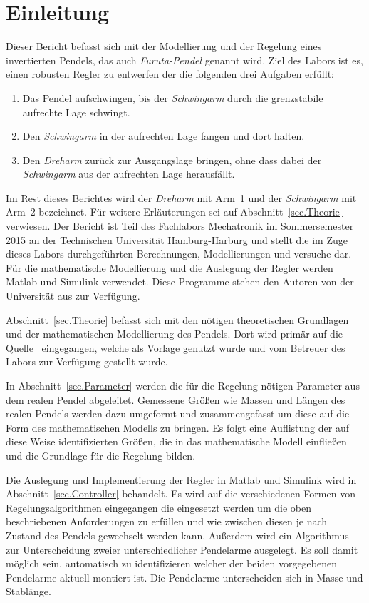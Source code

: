 \section{Einleitung}
\label{sec.Einleitung}

Dieser Bericht befasst sich mit der Modellierung und der Regelung eines invertierten Pendels, das auch \emph{Furuta-Pendel} genannt wird. 
Ziel des Labors ist es, einen robusten Regler zu entwerfen der die folgenden drei Aufgaben erfüllt:
\begin{enumerate}
	\item Das Pendel aufschwingen, bis der \emph{Schwingarm} durch die grenzstabile aufrechte Lage schwingt.
	\item Den \emph{Schwingarm} in der aufrechten Lage fangen und dort halten.
	\item Den \emph{Dreharm} zurück zur Ausgangslage bringen, ohne dass dabei der \emph{Schwingarm} aus der aufrechten Lage herausfällt.
\end{enumerate}
Im Rest dieses Berichtes wird der \emph{Dreharm} mit Arm~1 und der \emph{Schwingarm} mit Arm~2 bezeichnet.
Für weitere Erläuterungen sei auf Abschnitt~\ref{sec.Theorie} verwiesen.
Der Bericht ist Teil des Fachlabors Mechatronik im Sommersemester 2015 an der Technischen Universität Hamburg-Harburg und stellt die im Zuge dieses Labors durchgeführten Berechnungen, Modellierungen und versuche dar. 
Für die mathematische Modellierung und die Auslegung der Regler werden Matlab und Simulink verwendet.
Diese Programme stehen den Autoren von der Universität aus zur Verfügung.

Abschnitt~\ref{sec.Theorie} befasst sich mit den nötigen theoretischen Grundlagen und der mathematischen Modellierung des Pendels.
Dort wird primär auf die Quelle~\citep{Cazzolato.2011} eingegangen, welche als Vorlage genutzt wurde und vom Betreuer des Labors zur Verfügung gestellt wurde.

In Abschnitt~\ref{sec.Parameter} werden die für die Regelung nötigen Parameter aus dem realen Pendel abgeleitet. 
Gemessene Größen wie Massen und Längen des realen Pendels werden dazu umgeformt und zusammengefasst um diese auf die Form des mathematischen Modells zu bringen.
Es folgt eine Auflistung der auf diese Weise identifizierten Größen, die in das mathematische Modell einfließen und die Grundlage für die Regelung bilden.

Die Auslegung und Implementierung der Regler in Matlab und Simulink wird in Abschnitt~\ref{sec.Controller} behandelt.
Es wird auf die verschiedenen Formen von Regelungsalgorithmen eingegangen die eingesetzt werden um die oben beschriebenen Anforderungen zu erfüllen und wie zwischen diesen je nach Zustand des Pendels gewechselt werden kann.
Außerdem wird ein Algorithmus zur Unterscheidung zweier unterschiedlicher Pendelarme ausgelegt. 
Es soll damit möglich sein, automatisch zu identifizieren welcher der beiden vorgegebenen Pendelarme aktuell montiert ist. 
Die Pendelarme unterscheiden sich in Masse und Stablänge.

